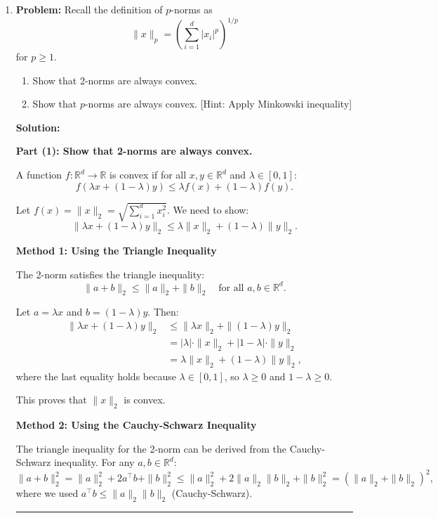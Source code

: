 \documentclass[12pt,letterpaper]{article}
\newenvironment{proof}{\noindent{\bf Proof:}}{\qed\bigskip}
\newcommand{\qed}{\rule{7pt}{7pt}}
\begin{document}
\begin{enumerate}
\begin{proof}
\end{proof}
	\item[3.]
    \textbf{Problem:} Recall the definition of $p$-norms as
\[
\|x\|_p = \left(\sum_{i=1}^{d}|x_i|^p\right)^{1/p}
\]
for $p \geq 1$.

\begin{enumerate}
    \item Show that 2-norms are always convex.
    \item Show that $p$-norms are always convex. [Hint: Apply Minkowski inequality]
\end{enumerate}

\bigskip

\textbf{Solution:}

\bigskip

\textbf{Part (1): Show that 2-norms are always convex.}

\begin{proof}
A function $f: \mathbb{R}^d \to \mathbb{R}$ is convex if for all $x, y \in \mathbb{R}^d$ and $\lambda \in [0,1]$:
\[
f(\lambda x + (1-\lambda)y) \leq \lambda f(x) + (1-\lambda)f(y).
\]

Let $f(x) = \|x\|_2 = \sqrt{\sum_{i=1}^{d} x_i^2}$. We need to show:
\[
\|\lambda x + (1-\lambda)y\|_2 \leq \lambda\|x\|_2 + (1-\lambda)\|y\|_2.
\]

\textbf{Method 1: Using the Triangle Inequality}

The 2-norm satisfies the triangle inequality:
\[
\|a + b\|_2 \leq \|a\|_2 + \|b\|_2 \quad \text{for all } a, b \in \mathbb{R}^d.
\]

Let $a = \lambda x$ and $b = (1-\lambda)y$. Then:
\begin{align*}
\|\lambda x + (1-\lambda)y\|_2 &\leq \|\lambda x\|_2 + \|(1-\lambda)y\|_2 \\
&= |\lambda| \cdot \|x\|_2 + |1-\lambda| \cdot \|y\|_2 \\
&= \lambda \|x\|_2 + (1-\lambda)\|y\|_2,
\end{align*}
where the last equality holds because $\lambda \in [0,1]$, so $\lambda \geq 0$ and $1-\lambda \geq 0$.

This proves that $\|x\|_2$ is convex.

\bigskip

\textbf{Method 2: Using the Cauchy-Schwarz Inequality}

The triangle inequality for the 2-norm can be derived from the Cauchy-Schwarz inequality. For any $a, b \in \mathbb{R}^d$:
\[
\|a + b\|_2^2 = \|a\|_2^2 + 2a^\top b + \|b\|_2^2 \leq \|a\|_2^2 + 2\|a\|_2\|b\|_2 + \|b\|_2^2 = (\|a\|_2 + \|b\|_2)^2,
\]
where we used $a^\top b \leq \|a\|_2\|b\|_2$ (Cauchy-Schwarz).


\end{proof}
\end{enumerate}
\end{document}
